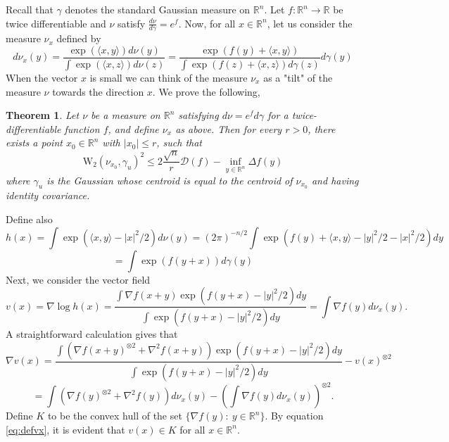 \documentclass[12pt]{article}
\def \WW{\mathrm{W_2}}
\def \RR {\mathbb R}
\def \Comp { \mathcal{D} }
\newtheorem{theorem}{Theorem}
\theoremstyle{definition}
\theoremstyle{remark}
\begin{document}
Recall that $\gamma$ denotes the standard Gaussian measure on $\RR^n$. Let $f:\RR^n \to \RR$ be twice differentiable and $\nu$ satisfy $\frac{d \nu}{d \gamma} = e^{f}$. 
Now, for all $x \in \RR^n$, let us consider the measure $\nu_x$ defined by
$$
d \nu_x(y) = \frac{\exp(\langle x, y \rangle) d \nu(y)}{\int \exp(\langle x, z \rangle) d \nu(z)} = \frac{\exp(f(y) + \langle x, y \rangle )}{ \int \exp(f(z) + \langle x, z \rangle) d \gamma(z) } d \gamma(y)
$$
When the vector $x$ is small we can think of the measure $\nu_x$ as a "tilt" of the measure $\nu$ towards the direction $x$. We prove the following,
\begin{theorem} \label{thm:gausstilt}
Let $\nu$ be a measure on $\RR^n$ satisfying $d \nu = e^f d \gamma$ for a twice-differentiable function $f$, and define $\nu_x$ as above. Then for every $r>0$, there exists a point $x_0 \in \RR^n$ with $|x_0| \leq r$, such that
$$
\WW(\nu_{x_0}, \gamma_{u})^2 \leq 2 \frac{\sqrt{n}}{r} \Comp(f) - \inf_{y \in \RR^n} \Delta f(y)
$$
where $\gamma_u$ is the Gaussian whose centroid is equal to the centroid of $\nu_{x_0}$ and having identity covariance.
\end{theorem}
Define also
$$
h(x) = \int \exp(\langle x, y \rangle - |x|^2/2) d \nu(y) = (2 \pi)^{-n/2} \int \exp(f(y) + \langle x, y \rangle - |y|^2/2 - |x|^2/2) dy
$$
$$
= \int \exp(f(y+x)) d \gamma(y)
$$
Next, we consider the vector field
\begin{equation}\label{eq:defvx}
v(x) = \nabla \log h(x) = \frac{\int \nabla f(x+y) \exp(f(y+x) - |y|^2/2) dy}{\int \exp(f(y+x) - |y|^2/2) dy} = \int \nabla f(y) d \nu_x(y).
\end{equation}
A straightforward calculation gives that
$$
\nabla v(x) = \frac{\int \left (\nabla f(x+y)^{\otimes 2} + \nabla^2 f(x+y) \right ) \exp(f(y+x) - |y|^2/2) dy}{\int \exp(f(y+x) - |y|^2/2) dy} - v(x)^{\otimes 2}
$$
\begin{equation}\label{eq:dvx}
= \int \left (\nabla f(y)^{\otimes 2}  + \nabla^2 f(y) \right ) d \nu_x(y) - \left ( \int \nabla f(y) d \nu_x(y) \right )^{\otimes 2}.
\end{equation}
Define $K$ to be the convex hull of the set $\{\nabla f(y): ~ y \in \RR^n \}$. By equation \eqref{eq:defvx}, it is evident that $v(x) \in K$ for all $x \in \RR^n$.
\end{document}
